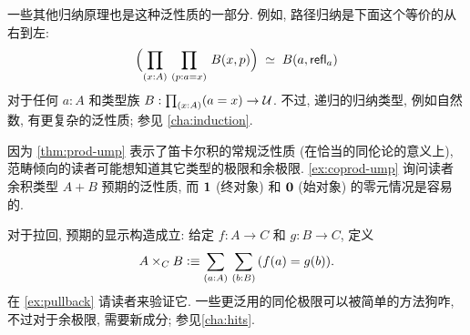 一些其他归纳原理也是这种泛性质的一部分.
例如, 路径归纳是下面这个等价的从右到左:
%
%
\begin{equation}
  \label{eq:path-lump}
  \eqvspaced{\Parens{\prd{x:A}{p:a=x} B(x,p)}}{B(a,\refl a)}
\end{equation}
对于任何 $a:A$ 和类型族 $B:\prd{x:A} (a=x) \to\type$.
不过, 递归的归纳类型, 例如自然数, 有更复杂的泛性质; 参见 \cref{cha:induction}.

%
%
%
%
因为 \cref{thm:prod-ump} 表示了笛卡尔积的常规泛性质 (在恰当的同伦论的意义上), 范畴倾向的读者可能想知道其它类型的极限和余极限.
\cref{ex:coprod-ump} 询问读者余积类型 $A+B$ 预期的泛性质, 而 $\mathbf{1}$ (终对象) 和 $\mathbf{0}$ (始对象) 的零元情况是容易的.
%
%
%
%

%
对于拉回, 预期的显示构造成立: 给定 $f:A\to C$ 和 $g:B\to C$, 定义
\begin{equation}
  A\times_C B \defeq \sm{a:A}{b:B} (f(a)=g(b)).\label{eq:defn-pullback}
\end{equation}
在 \cref{ex:pullback} 请读者来验证它.
一些更泛用的同伦极限可以被简单的方法狗咋, 不过对于余极限, 需要新成分; 参见\cref{cha:hits}.

%